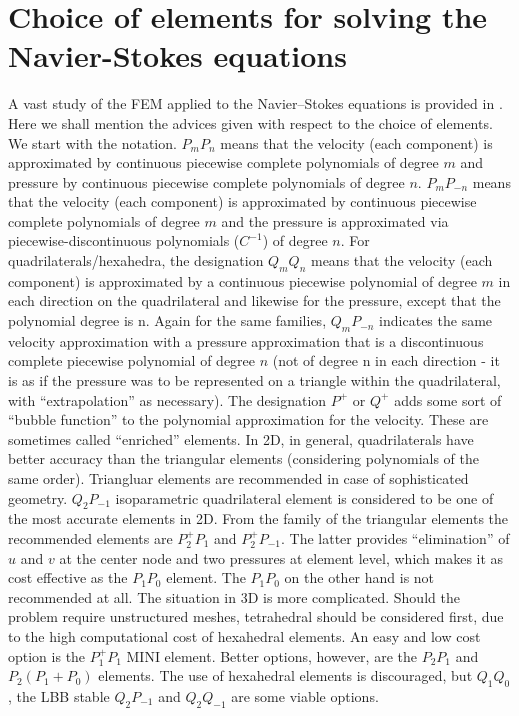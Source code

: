 \section{Choice of elements for solving the Navier-Stokes equations}
A vast study of the FEM applied to the Navier--Stokes equations is provided in \cite{gresho-fem}. Here we shall mention the advices given with respect to the choice of elements. We start with the notation. $P_mP_n$ means that the velocity (each component) is approximated by continuous piecewise complete polynomials of degree $m$ and pressure by continuous piecewise complete polynomials of degree $n$. $P_mP_{-n}$ means that the velocity (each component) is approximated by continuous piecewise complete polynomials of degree $m$ and the pressure is approximated via piecewise-discontinuous polynomials ($C^{-1}$) of degree $n$. For quadrilaterals/hexahedra, the designation $Q_mQ_n$ means that the velocity (each component) is approximated by a continuous piecewise polynomial of degree $m$ in each direction on the quadrilateral and likewise for the pressure, except that the polynomial degree is n. Again for the same families, $Q_mP_{-n}$ indicates the same velocity approximation with a pressure approximation that is a discontinuous complete piecewise polynomial of degree $n$ (not of degree n in each direction - it is as if the pressure was to be represented on a triangle within the quadrilateral, with ``extrapolation'' as necessary). The designation $P^+$ or $Q^+$ adds some sort of ``bubble function'' to the polynomial approximation for the velocity. These are sometimes called ``enriched'' elements. In 2D, in general, quadrilaterals have better accuracy than the triangular elements (considering polynomials of the same order). Triangluar elements are recommended in case of sophisticated geometry. $Q_2P_{-1}$ isoparametric quadrilateral element is considered to be one of the most accurate elements in 2D. From the family of the triangular elements the recommended elements are $P^+_2P_1$ and $P^+_2P_{-1}$. The latter provides ``elimination'' of $u$ and $v$ at the center node and two pressures at element level, which makes it as cost effective as the $P_1P_0$ element. The $P_1P_0$ on the other hand is not recommended at all. The situation in 3D is more complicated. Should the problem require unstructured meshes, tetrahedral should be considered first, due to the high computational cost of hexahedral elements. An easy and low cost option is the $P^+_1P_1$ MINI element. Better options, however, are the $P_2P_1$ and $P_2(P_1 + P_0)$ elements. The use of hexahedral elements is discouraged, but $Q_1Q_0$, the LBB stable $Q_2P_{-1}$ and $Q_2Q_{-1}$ are some viable options.

